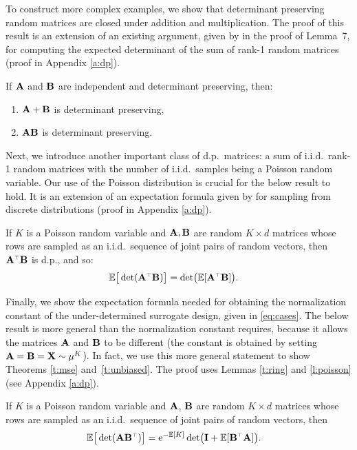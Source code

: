 \documentclass[thesis.tex]{subfiles}
\begin{document}
\noindent
To construct more complex examples, we show that determinant preserving random matrices are
closed under addition and multiplication. The proof of this result is
an extension of an existing argument, given by
\cite{determinantal-averaging} in the proof of Lemma~7, for computing
the expected determinant of the sum of rank-1 random matrices (proof in Appendix \ref{a:dp}).
\begin{lemma}\label{t:ring}
  If $\mathbf A$ and $\mathbf B$ are independent and determinant preserving, then:
  \vspace{-1mm}
  \begin{enumerate}
    \item $\mathbf A+\mathbf B$ is determinant preserving,
          \vspace{-2mm}
    \item $\mathbf A\mathbf B$ is determinant preserving.
  \end{enumerate}
\end{lemma}

\noindent
Next, we introduce another important class of d.p.~matrices:
a sum of i.i.d.~rank-1 random matrices with the number of
i.i.d.~samples being a Poisson random variable. Our use of the Poisson
distribution is crucial for the below result to hold. It is an
extension of an expectation formula given by \cite{dpp-intermediate}
for sampling from discrete distributions (proof in Appendix \ref{a:dp}).
\begin{lemma}\label{l:poisson}
  If $K$ is a Poisson random variable and $\mathbf A,\mathbf B$ are random $K\times d$
  matrices whose rows  are sampled as an i.i.d.~sequence of joint pairs of
  random vectors, then $\A^\top\B$ is d.p., and so:
  \begin{align*}
    \E\big[\det(\A^\top\B)\big] & = \det\!\big(\E[\A^\top\B]\big).
  \end{align*}
\end{lemma}

\noindent
Finally, we show the expectation formula needed for obtaining the
normalization constant of the under-determined surrogate design, given
in \eqref{eq:cases}.
The below result is more general than the normalization constant
requires, because it allows the matrices $\mathbf A$ and $\mathbf B$ to be different
(the constant is obtained by setting $\mathbf A=\mathbf B=\mathbf X\sim\mu^K$).
In fact, we use this more general statement to show Theorems
\ref{t:mse} and~\ref{t:unbiased}. The proof uses
Lemmas \ref{t:ring} and \ref{l:poisson} (see Appendix \ref{a:dp}).
\begin{lemma}\label{l:normalization}
  If $K$ is a Poisson random variable and $\mathbf A$, $\mathbf B$ are random $K\times d$
  matrices whose rows  are sampled as an i.i.d.~sequence of joint pairs of
  random vectors, then
  \begin{align*}
    \E\big[\det(\A\B^\top)\big] & = \ee^{-\E[K]}\det\!\big(\I + \E[\B^\top\A]\big).
  \end{align*}
\end{lemma}
\end{document}
